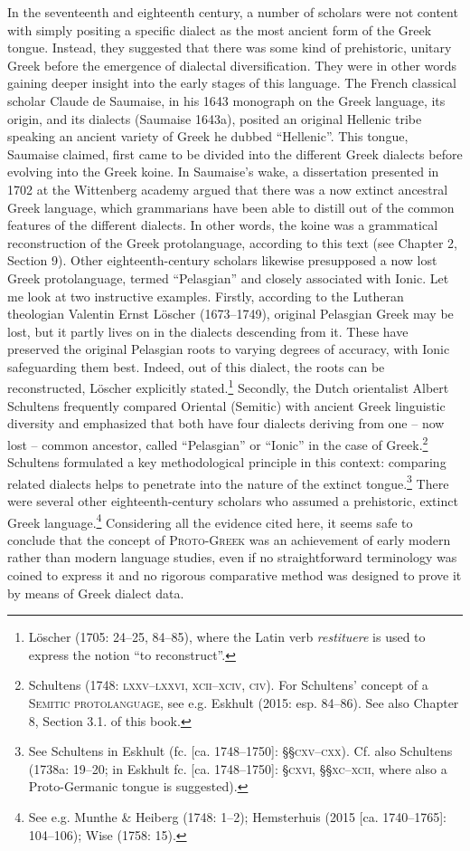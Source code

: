 \documentclass[12pt]{article}
\newenvironment{styleStandard}{\renewcommand\baselinestretch{1.25}\setlength\leftskip{0in}\setlength\rightskip{0in}\setlength\parindent{0.1972in}\setlength\parfillskip{0pt plus 1fil}\setlength\parskip{0in plus 1pt}\writerlistparindent\writerlistleftskip\leavevmode\normalfont\normalsize\writerlistlabel\ignorespaces}{\unskip\vspace{0in plus 1pt}\par}
\newcommand\writerlistleftskip{}
\newcommand\writerlistparindent{}
\newcommand\writerlistlabel{}
\begin{document}
\begin{styleStandard}
In the seventeenth and eighteenth century, a number of scholars were not content with simply positing a specific dialect as the most ancient form of the Greek tongue. Instead, they suggested that there was some kind of prehistoric, unitary Greek before the emergence of dialectal diversification. They were in other words gaining deeper insight into the early stages of this language. The French classical scholar Claude de Saumaise, in his 1643 monograph on the Greek language, its origin, and its dialects (Saumaise 1643a), posited an original Hellenic tribe speaking an ancient variety of Greek he dubbed “Hellenic”. This tongue, Saumaise claimed, first came to be divided into the different Greek dialects before evolving into the Greek koine. In Saumaise’s wake, a dissertation presented in 1702 at the Wittenberg academy argued that there was a now extinct ancestral Greek language, which grammarians have been able to distill out of the common features of the different dialects. In other words, the koine was a grammatical reconstruction of the Greek protolanguage, according to this text (see Chapter 2, Section 9). Other eighteenth-century scholars likewise presupposed a now lost Greek protolanguage, termed “Pelasgian” and closely associated with Ionic. Let me look at two instructive examples. Firstly, according to the Lutheran theologian Valentin Ernst Löscher (1673–1749), original Pelasgian Greek may be lost, but it partly lives on in the dialects descending from it. These have preserved the original Pelasgian roots to varying degrees of accuracy, with Ionic safeguarding them best. Indeed, out of this dialect, the roots can be reconstructed, Löscher explicitly stated.\footnote{ Löscher (1705: 24–25, 84–85), where the Latin verb \textit{restituere} is used to express the notion “to reconstruct”.} Secondly, the Dutch orientalist Albert Schultens frequently compared Oriental (Semitic) with ancient Greek linguistic diversity and emphasized that both have four dialects deriving from one – now lost – common ancestor, called “Pelasgian” or “Ionic” in the case of Greek.\footnote{ Schultens (1748: \textsc{lxxv–lxxvi, xcii–xciv, civ}). For Schultens’ concept of a \textsc{Semitic protolanguage}, see e.g. Eskhult (2015: esp. 84–86). See also Chapter 8, Section 3.1. of this book.} Schultens formulated a key methodological principle in this context: comparing related dialects helps to penetrate into the nature of the extinct tongue.\footnote{ See Schultens in Eskhult (fc. [ca. 1748–1750]: §§\textsc{cxv–cxx}). Cf. also Schultens (1738a: 19–20; in Eskhult fc. [ca. 1748–1750]: §\textsc{cxvi}, §§\textsc{xc–xcii, }where also a Proto-Germanic tongue is suggested).} There were several other eighteenth-century scholars who assumed a prehistoric, extinct Greek language.\footnote{ See e.g. Munthe \& Heiberg (1748: 1–2); Hemsterhuis (2015 [ca. 1740–1765]: 104–106); Wise (1758: 15).} Considering all the evidence cited here, it seems safe to conclude that the concept of \textsc{Proto-Greek} was an achievement of early modern rather than modern language studies, even if no straightforward terminology was coined to express it and no rigorous comparative method was designed to prove it by means of Greek dialect data.

\end{styleStandard}
\end{document}
